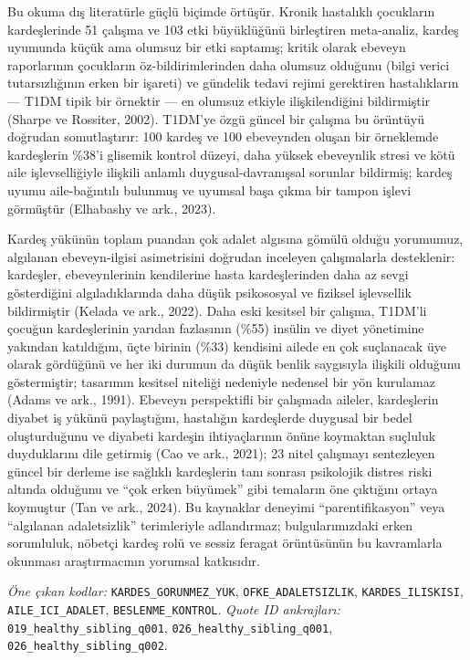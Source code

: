 \documentclass[
  turkish,
  a4paper,
  DIV=11,
  numbers=noendperiod]{scrreprt}
\begin{document}
Bu okuma dış literatürle güçlü biçimde örtüşür. Kronik hastalıklı
çocukların kardeşlerinde 51 çalışma ve 103 etki büyüklüğünü birleştiren
meta-analiz, kardeş uyumunda küçük ama olumsuz bir etki saptamış; kritik
olarak ebeveyn raporlarının çocukların öz-bildirimlerinden daha olumsuz
olduğunu (bilgi verici tutarsızlığının erken bir işareti) ve gündelik
tedavi rejimi gerektiren hastalıkların --- T1DM tipik bir örnektir ---
en olumsuz etkiyle ilişkilendiğini bildirmiştir (Sharpe ve Rossiter,
2002). T1DM'ye özgü güncel bir çalışma bu örüntüyü doğrudan
somutlaştırır: 100 kardeş ve 100 ebeveynden oluşan bir örneklemde
kardeşlerin \%38'i glisemik kontrol düzeyi, daha yüksek ebeveynlik stresi ve
kötü aile işlevselliğiyle ilişkili anlamlı duygusal-davranışsal sorunlar
bildirmiş; kardeş uyumu aile-bağıntılı bulunmuş ve uyumsal başa çıkma
bir tampon işlevi görmüştür (Elhabashy ve ark., 2023).

Kardeş yükünün toplam puandan çok adalet algısına gömülü olduğu
yorumumuz, algılanan ebeveyn-ilgisi asimetrisini doğrudan inceleyen
çalışmalarla desteklenir: kardeşler, ebeveynlerinin kendilerine hasta
kardeşlerinden daha az sevgi gösterdiğini algıladıklarında daha düşük
psikososyal ve fiziksel işlevsellik bildirmiştir (Kelada ve ark., 2022).
Daha eski kesitsel bir çalışma, T1DM'li çocuğun kardeşlerinin yarıdan
fazlasının (\%55) insülin ve diyet yönetimine yakından katıldığını, üçte
birinin (\%33) kendisini ailede en çok suçlanacak üye olarak gördüğünü
ve her iki durumun da düşük benlik saygısıyla ilişkili olduğunu
göstermiştir; tasarımın kesitsel niteliği nedeniyle nedensel bir yön
kurulamaz (Adams ve ark., 1991). Ebeveyn perspektifli bir çalışmada
aileler, kardeşlerin diyabet iş yükünü paylaştığını, hastalığın
kardeşlerde duygusal bir bedel oluşturduğunu ve diyabeti kardeşin
ihtiyaçlarının önüne koymaktan suçluluk duyduklarını dile getirmiş (Cao
ve ark., 2021); 23 nitel çalışmayı sentezleyen güncel bir derleme ise
sağlıklı kardeşlerin tanı sonrası psikolojik distres riski altında
olduğunu ve ``çok erken büyümek'' gibi temaların öne çıktığını ortaya
koymuştur (Tan ve ark., 2024). Bu kaynaklar deneyimi ``parentifikasyon''
veya ``algılanan adaletsizlik'' terimleriyle adlandırmaz;
bulgularımızdaki erken sorumluluk, nöbetçi kardeş rolü ve sessiz feragat
örüntüsünün bu kavramlarla okunması araştırmacının yorumsal katkısıdır.

\emph{Öne çıkan kodlar:} \texttt{KARDES\_GORUNMEZ\_YUK},
\texttt{OFKE\_ADALETSIZLIK}, \texttt{KARDES\_ILISKISI},
\texttt{AILE\_ICI\_ADALET}, \texttt{BESLENME\_KONTROL}. \emph{Quote ID
ankrajları:} \texttt{019\_healthy\_sibling\_q001},
\texttt{026\_healthy\_sibling\_q001},
\texttt{026\_healthy\_sibling\_q002}.
\end{document}
